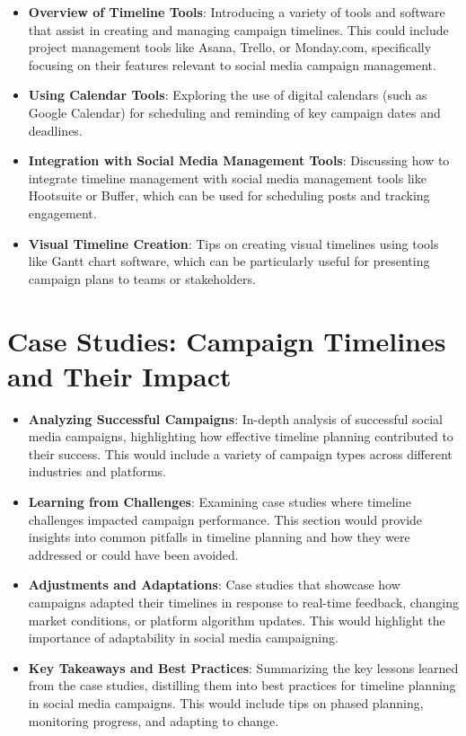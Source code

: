 \documentclass[
]{book}
\providecommand{\tightlist}{%
  \setlength{\itemsep}{0pt}\setlength{\parskip}{0pt}}
\begin{document}
\begin{itemize}
\tightlist
\item
  \textbf{Overview of Timeline Tools}: Introducing a variety of tools and software that assist in creating and managing campaign timelines. This could include project management tools like Asana, Trello, or Monday.com, specifically focusing on their features relevant to social media campaign management.
\item
  \textbf{Using Calendar Tools}: Exploring the use of digital calendars (such as Google Calendar) for scheduling and reminding of key campaign dates and deadlines.
\item
  \textbf{Integration with Social Media Management Tools}: Discussing how to integrate timeline management with social media management tools like Hootsuite or Buffer, which can be used for scheduling posts and tracking engagement.
\item
  \textbf{Visual Timeline Creation}: Tips on creating visual timelines using tools like Gantt chart software, which can be particularly useful for presenting campaign plans to teams or stakeholders.
\end{itemize}

\hypertarget{case-studies-campaign-timelines-and-their-impact}{%
\section*{Case Studies: Campaign Timelines and Their Impact}\label{case-studies-campaign-timelines-and-their-impact}}

\begin{itemize}
\tightlist
\item
  \textbf{Analyzing Successful Campaigns}: In-depth analysis of successful social media campaigns, highlighting how effective timeline planning contributed to their success. This would include a variety of campaign types across different industries and platforms.
\item
  \textbf{Learning from Challenges}: Examining case studies where timeline challenges impacted campaign performance. This section would provide insights into common pitfalls in timeline planning and how they were addressed or could have been avoided.
\item
  \textbf{Adjustments and Adaptations}: Case studies that showcase how campaigns adapted their timelines in response to real-time feedback, changing market conditions, or platform algorithm updates. This would highlight the importance of adaptability in social media campaigning.
\item
  \textbf{Key Takeaways and Best Practices}: Summarizing the key lessons learned from the case studies, distilling them into best practices for timeline planning in social media campaigns. This would include tips on phased planning, monitoring progress, and adapting to change.
\end{itemize}
\end{document}
